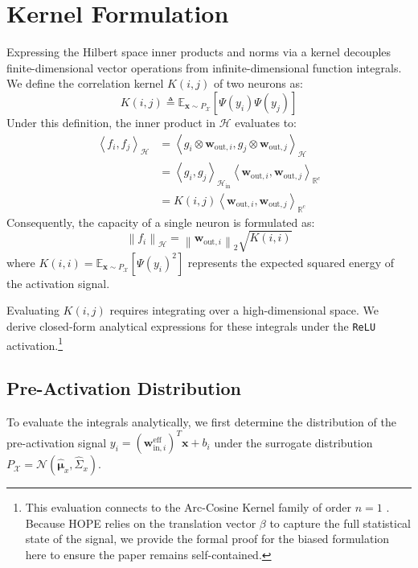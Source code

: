 \documentclass[11pt, a4paper, copyright, gdm]{google}
\newcommand{\norm}[1]{\left\lVert#1\right\rVert}
\newcommand{\inner}[2]{\left\langle#1, #2\right\rangle}
\newcommand{\wVect}{\boldsymbol{w}}
\newcommand{\xVect}{\boldsymbol{x}}
\newcommand{\muVect}{\boldsymbol{\mu}}
\newcommand{\calH}{\mathcal{H}}
\newcommand{\calN}{\mathcal{N}}
\newcommand{\calX}{\mathcal{X}}
\newcommand{\R}{\mathbb{R}}
\newcommand{\E}{\mathbb{E}}
\newcommand{\ReLU}{\texttt{ReLU}\xspace}
\theoremstyle{definition}
\begin{document}
\section{Kernel Formulation}
\label{sec:kernel}
Expressing the Hilbert space inner products and norms via a kernel decouples finite-dimensional vector operations from infinite-dimensional function integrals. We define the correlation kernel $K(i, j)$ of two neurons as:
\begin{equation}
\label{eq:kernel}
K(i, j) \triangleq \E_{\xVect \sim P_{\calX}} [ \Psi(y_i) \Psi(y_j) ]
\end{equation}
Under this definition, the inner product in $\calH$ evaluates to:
\begin{align}
\label{eq:hilbert_inner_prod}
    \inner{f_i}{f_j}_{\calH} &= \inner{g_i \otimes \wVect_{\text{out},i}}{g_j \otimes \wVect_{\text{out},j}}_{\calH} \nonumber \\
    &= \inner{g_i}{g_j}_{\calH_{\text{in}}} \inner{\wVect_{\text{out},i}}{\wVect_{\text{out},j}}_{\R^c} \nonumber \\
    &= K(i,j) \inner{\wVect_{\text{out},i}}{\wVect_{\text{out},j}}_{\R^c}
\end{align}
Consequently, the capacity of a single neuron is formulated as:
\begin{equation}
    \norm{f_i}_{\calH} = \norm{\wVect_{\text{out},i}}_2 \sqrt{K(i, i)}
\end{equation}
where $K(i, i) = \E_{\xVect \sim P_{\calX}} [ \Psi(y_i)^2 ]$ represents the expected squared energy of the activation signal. 

Evaluating $K(i,j)$ requires integrating over a high-dimensional space. We derive closed-form analytical expressions for these integrals under the \ReLU activation.\footnote{This evaluation connects to the Arc-Cosine Kernel family of order $n=1$ \cite{cho2009kernel}. Because HOPE relies on the translation vector $\beta$ to capture the full statistical state of the signal, we provide the formal proof for the biased formulation here to ensure the paper remains self-contained.}

\subsection{Pre-Activation Distribution}

To evaluate the integrals analytically, we first determine the distribution of the pre-activation signal $y_i = (\wVect_{\text{in},i}^{\text{eff}})^T \xVect + b_i$ under the surrogate distribution $P_{\calX} = \calN(\hat{\muVect}_x, \hat{\Sigma}_x)$. 
\end{document}
